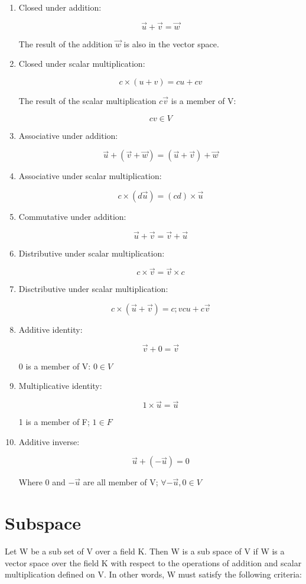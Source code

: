 \documentclass{book}
\begin{document}
\begin{enumerate}
	\item Closed under addition:

		\[\vec u + \vec v = \vec w\]

		The result of the addition \(\vec w\) is also in the vector space.

	\item Closed under scalar multiplication:

		\[c \times (u + v) = cu + cv\]

		The result of the scalar multiplication \(c \vec v\) is a member of V:

		\[cv \in V\]

	\item Associative under addition:

		\[\vec u + (\vec v + \vec w) = (\vec u + \vec v) + \vec w\]
	\item Associative under scalar multiplication:

		\[c \times (d \vec u) = (cd) \times \vec u\]
	\item Commutative under addition:

		\[\vec u + \vec v = \vec v + \vec u\]
	\item Distributive under scalar multiplication:

		\[c \times \vec v = \vec v \times c\]

	\item Disctributive under scalar multiplication:

		\[c \times (\vec u + \vec v) = c ;vc u + c \vec v\]

	\item Additive identity:

		\[\vec v + 0 = \vec v\]

		0 is a member of V: \(0 \in V\)
	\item Multiplicative identity:

		\[1 \times \vec u = \vec u\]

		1 is a member of F; \(1 \in F\)

	\item Additive inverse:

		\[\vec u + (- \vec u) = 0\]

		Where 0 and \(- \vec u\) are all member of V; \(\forall - \vec u, 0 \in V\)
\end{enumerate}

\section{Subspace}
Let W be a sub set of V over a field K. Then W is a sub space of V if W is a vector space over the field K with respect to the operations of addition and scalar multiplication defined on V. In other words, W must satisfy the following criteria:
\end{document}
